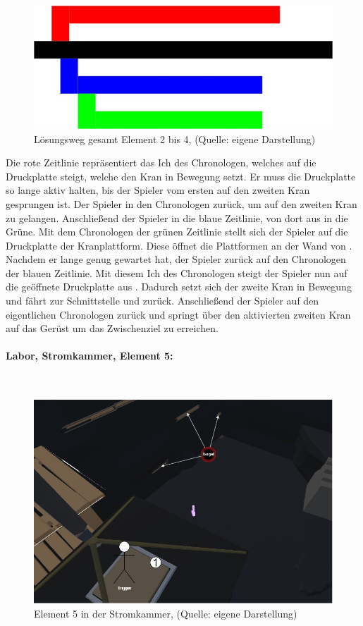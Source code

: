 \begin{figure}[ht]
\centering
\includegraphics[width=0.8\linewidth]{content/pictures/Raetsel-L02_E02_4_V01_Loesung}
\caption{Lösungsweg gesamt Element 2 bis 4, (Quelle: eigene Darstellung)}
\label{fig:L02_E02_04_L01}
\end{figure}

Die rote Zeitlinie repräsentiert das Ich des Chronologen, welches auf die Druckplatte steigt, welche den Kran in Bewegung setzt. Er muss die Druckplatte so lange aktiv halten, bis der Spieler vom ersten auf den zweiten Kran gesprungen ist. Der Spieler  in den Chronologen zurück, um auf den zweiten Kran zu gelangen. Anschließend  der Spieler in die blaue Zeitlinie, von dort aus in die Grüne. Mit dem Chronologen der grünen Zeitlinie stellt sich der Spieler auf die Druckplatte der Kranplattform. Diese öffnet die Plattformen an der Wand von . Nachdem er lange genug gewartet hat,  der Spieler zurück auf den Chronologen der blauen Zeitlinie. Mit diesem Ich des Chronologen steigt der Spieler nun auf die geöffnete Druckplatte aus . Dadurch setzt sich der zweite Kran in Bewegung und fährt zur Schnittstelle und zurück. Anschließend  der Spieler auf den eigentlichen Chronologen zurück und springt über den aktivierten zweiten Kran auf das Gerüst um das Zwischenziel zu erreichen.

\paragraph{Labor, Stromkammer, Element 5:}\label{p:lse5}
~
\begin{figure}[ht]
\centering
\includegraphics[width=0.8\linewidth]{content/pictures/Raetsel-L02_R01_R05.jpg}
\caption{Element 5 in der Stromkammer, (Quelle: eigene Darstellung)}
\label{fig:L02_R01_R05}
\end{figure}


